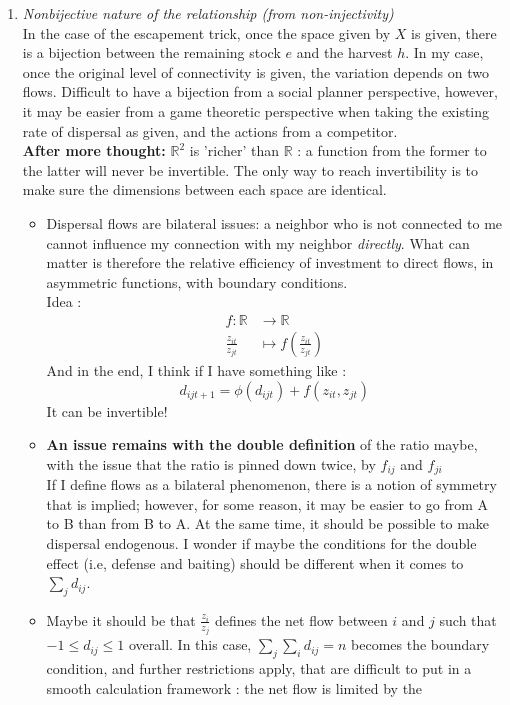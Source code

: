 \documentclass{article}
\begin{document}
\begin{enumerate}
    \item \textit{Nonbijective nature of the relationship (from non-injectivity)}\\
    In the case of the escapement trick, once the space given by $X$ is given, there is a bijection between the remaining stock $e$ and the harvest $h$. In my case, once the original level of connectivity is given, the variation depends on two flows. Difficult to have a bijection from a social planner perspective, however, it may be easier from a game theoretic perspective when taking the existing rate of dispersal as given, and the actions from a competitor. \\
    \textbf{After more thought:} $\mathbb{R}^2$ is 'richer' than $\mathbb{R}$ : a function from the former to the latter will never be invertible. The only way to reach invertibility is to make sure the dimensions between each space are identical.
    \begin{itemize}
        \item Dispersal flows are bilateral issues: a neighbor who is not connected to me cannot influence my connection with my neighbor \textit{directly}. What can matter is therefore the relative efficiency of investment to direct flows, in asymmetric functions, with boundary conditions.\\
        Idea : 
        \begin{align*}
        f: \mathbb{R} &\rightarrow \mathbb{R}\\
            \frac{z_{it}}{z_{jt}} &\mapsto f\left(\frac{z_{it}}{z_{jt}}\right)
        \end{align*}
        And in the end, I think if I have something like :
        $$
        d_{ijt+1} = \phi(d_{ijt}) + f(z_{it}, z_{jt})
        $$
        It can be invertible!\\
       \item \textbf{ An issue remains with the double definition} of the ratio maybe, with the issue that the ratio is pinned down twice, by $f_{ij}$ and $f_{ji}$
        \\
        If I define flows as a bilateral phenomenon, there is a notion of symmetry that is implied; however, for some reason, it may be easier to go from A to B than from B to A. At the same time, it should be possible to make dispersal endogenous. I wonder if maybe the conditions for the double effect (i.e, defense and baiting) should be different when it comes to $\sum_j d_{ij}$. 
        \item Maybe it should be that $\frac{z_i}{z_j}$ defines the net flow between $i$ and $j$ such that $-1 \leq d_{ij} \leq 1$ overall. In this case, $\sum_j \sum_i d_{ij}=n$ becomes the boundary condition, and further restrictions apply, that are difficult to put in a smooth calculation framework : the net flow is limited by the 

\end{itemize}
\end{enumerate}
\end{document}
